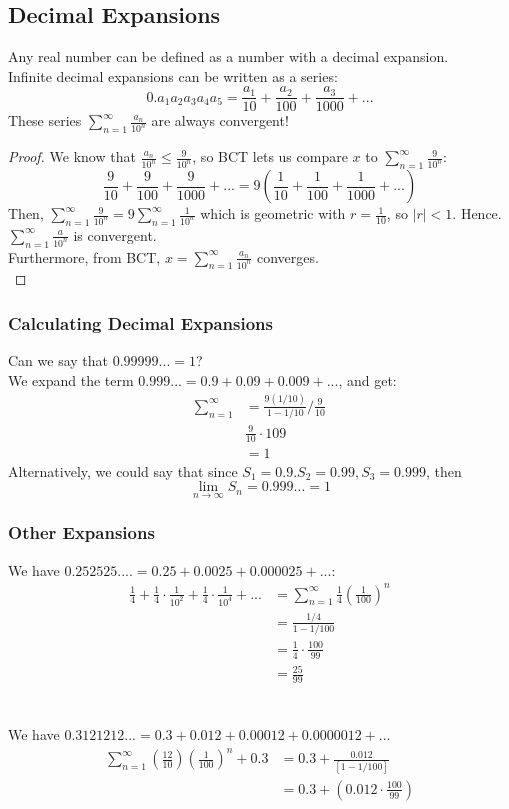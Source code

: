 \documentclass{article}
\begin{document}
\subsection{Decimal Expansions}
Any real number can be defined as a number with a decimal expansion.\\
Infinite decimal expansions can be written as a series:
$$0.a_1a_2a_3a_4a_5 = \frac{a_1}{10} + \frac{a_2}{100} + \frac{a_3}{1000} + ...$$
These series $\sum_{n=1}^\infty \frac{a_n}{10^n}$ are always convergent!
\begin{proof}
We know that $\frac{a_n}{10^n} \leq \frac{9}{10^n}$, so BCT lets us compare $x$ to $\sum_{n=1}^\infty \frac{9}{10^n}$:
$$\frac{9}{10} + \frac{9}{100} + \frac{9}{1000} + ... = 9(\frac{1}{10} + \frac{1}{100} + \frac{1}{1000} + ...)$$
Then, $\sum_{n=1}^\infty \frac{9}{10^n} = 9 \sum_{n=1}^\infty \frac{1}{10^n}$ which is geometric with $r=\frac{1}{10}$, so $|r| < 1$. Hence. $\sum_{n=1}^\infty \frac{a}{10^n}$ is convergent.\\
Furthermore, from BCT, $x = \sum_{n=1}^\infty \frac{a_n}{10^n}$ converges.\\
\end{proof}
\subsubsection{Calculating Decimal Expansions}
Can we say that $0.99999... = 1$?\\
We expand the term $0.999... = 0.9 + 0.09 + 0.009 + ...$, and get:
\begin{align*}
    \sum_{n=1}^\infty & = \frac{9(1/10)}{1- 1/10} / \frac{9}{10}\\
    & \frac{9}{10} \cdot {10}{9}\\
    & = 1
\end{align*}
Alternatively, we could say that since $S_1 = 0.9. S_2 = 0.99, S_3 = 0.999$, then
$$\lim_{n\to\infty} S_n = 0.999 ... = 1$$

\subsubsection{Other Expansions}
We have $0.252525.... = 0.25 + 0.0025 + 0.000025 + ...$:
\begin{align*}
    \frac{1}{4} + \frac{1}{4} \cdot \frac{1}{10^2} + \frac{1}{4} \cdot \frac{1}{10^4} + ... & = \sum_{n=1}^\infty \frac{1}{4}(\frac{1}{100})^n\\
    & = \frac{1/4}{1 - 1/100}\\
    & = \frac{1}{4} \cdot \frac{100}{99}\\
    & = \frac{25}{99}
\end{align*}
\\
\\
We have $0.3121212... = 0.3 + 0.012 + 0.00012 + 0.0000012 + ...$\\
\begin{align*}
    \sum_{n=1}^\infty (\frac{12}{10})(\frac{1}{100})^n + 0.3 & = 0.3 + \frac{0.012}{[1 - 1/100]}\\
    & = 0.3 + (0.012 \cdot \frac{100}{99})
\end{align*}
\end{document}
